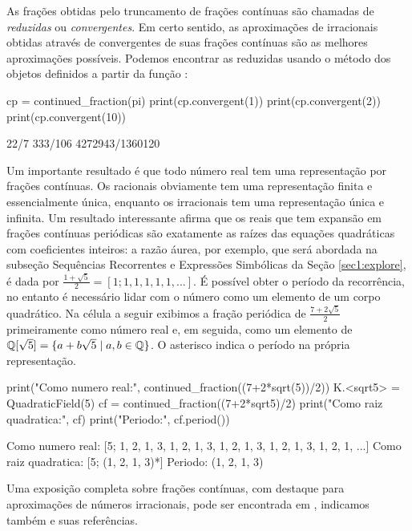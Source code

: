 As frações obtidas pelo truncamento de
frações contínuas são chamadas de \emph{reduzidas}
ou \emph{convergentes}. Em certo sentido, as aproximações
de irracionais obtidas através de convergentes de suas
frações contínuas são as melhores aproximações possíveis.
Podemos encontrar as reduzidas 
usando o método   dos objetos
definidos a partir da função :
\begin{sageinput}
cp = continued_fraction(pi)
print(cp.convergent(1))
print(cp.convergent(2))
print(cp.convergent(10))
\end{sageinput}
\begin{sageoutput}
22/7
333/106
4272943/1360120
\end{sageoutput}

Um importante resultado é que todo número real tem uma representação
por frações contínuas. Os racionais obviamente tem uma representação finita e
essencialmente única, enquanto os irracionais tem uma representação única e
infinita. Um resultado interessante afirma que os reais que tem 
expansão em frações contínuas periódicas são exatamente as
raízes das equações quadráticas com coeficientes inteiros: a
razão áurea, por exemplo, que será abordada na subseção
Sequências Recorrentes e Expressões Simbólicas da Seção \ref{sec1:explore},
é dada por $\frac{1+\sqrt{5}}{2} = [1;1,1,1,1,1,...]$.
É possível obter o período da recorrência, no entanto
é necessário lidar com o número como um elemento
de um corpo quadrático. Na célula a seguir 
exibimos a fração periódica de $\frac{7+2\sqrt{5}}{2}$
primeiramente como número real e, em seguida, como um
elemento de $\mathbb{Q}[\sqrt{5}]= \{a+b\sqrt{5} \mid a,b \in \mathbb{Q}\}$.
O asterisco indica o período
na própria representação.

\begin{sageinput}
print("Como numero real:", continued_fraction((7+2*sqrt(5))/2))
K.<sqrt5> = QuadraticField(5) 
cf = continued_fraction((7+2*sqrt5)/2)
print("Como raiz quadratica:", cf)
print("Periodo:", cf.period())
\end{sageinput}
\begin{sageoutput}
Como numero real: [5; 1, 2, 1, 3, 1, 2, 1, 3, 1, 2, 1, 3, 1, 2, 1, 3, 1, 2, 1, ...]
Como raiz quadratica: [5; (1, 2, 1, 3)*]
Periodo: (1, 2, 1, 3)
\end{sageoutput}



Uma exposição completa sobre frações contínuas,
com destaque para aproximações de números irracionais,
pode ser encontrada em \cite[Cap. 3]{tnumgugu}, indicamos
também \cite{de2005fracoes} e suas referências.


